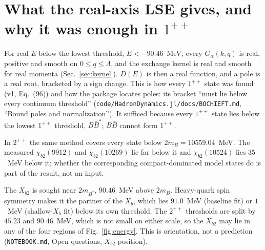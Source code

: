 \documentclass[11pt]{article}
\newcommand{\file}[1]{\nolinkurl{#1}}
\begin{document}
\section{What the real-axis LSE gives, and why it was enough in \texorpdfstring{$1^{++}$}{1++}}\label{sec:realaxis}

For real $E$ below the lowest threshold, $E<-90.46$~MeV, every $G_\alpha(k,q)$ is real, positive and smooth on $0\le q\le\Lambda$, and the exchange kernel is real and smooth for real momenta (Sec.~\ref{sec:kernel}). $D(E)$ is then a real function, and a pole is a real root, bracketed by a sign change. This is how every $1^{++}$ state was found (v1, Eq.~(96)) and how the package locates poles: its bracket ``must lie below every continuum threshold'' (\file{code/HadronDynamics.jl/docs/BOCHIEFT.md}, ``Bound poles and normalization''). It sufficed because every $1^{++}$ state lies below the lowest $1^{++}$ threshold, $B\bar B^*$; $B\bar B$ cannot form $1^{++}$.

In $2^{++}$ the same method covers every state below $2m_B=10559.04$~MeV. The measured $\chi_{b2}(9912)$ and $\chi_{b2}(10269)$ lie far below it and $\chi_{b2}(10524)$ lies $35$~MeV below it; whether the corresponding compact-dominated model states do is part of the result, not an input.

The $X_{b2}$ is sought near $2m_{B^*}$, $90.46$~MeV above $2m_B$. Heavy-quark spin symmetry makes it the partner of the $X_b$, which lies $91.0$~MeV (baseline fit) or $1$~MeV (shallow-$X_b$ fit) below its own threshold. The $2^{++}$ thresholds are split by $45.23$ and $90.46$~MeV, which is not small on either scale, so the $X_{b2}$ may lie in any of the four regions of Fig.~\ref{fig:energy}. This is orientation, not a prediction (\file{NOTEBOOK.md}, Open questions, $X_{b2}$ position).
\end{document}
